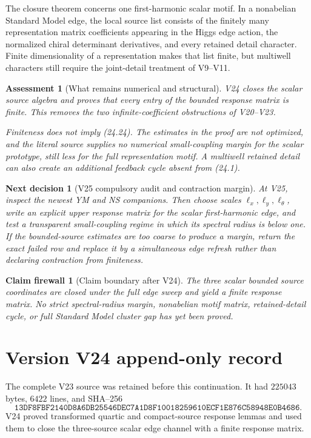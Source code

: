 \documentclass[11pt]{article}
\newtheorem{firewall}[theorem]{Claim firewall}
\newtheorem{decision}[theorem]{Next decision}
\newtheorem{assessment}[theorem]{Assessment}
\theoremstyle{remark}
\begin{document}
The closure theorem concerns one first-harmonic scalar motif.  In a
nonabelian Standard Model edge, the local source list consists of
the finitely many representation matrix coefficients appearing in
the Higgs edge action, the normalized chiral determinant
derivatives, and every retained detail character.  Finite
dimensionality of a representation makes that list finite, but
multiwell characters still require the joint-detail treatment of
V9--V11.

\begin{assessment}[What remains numerical and structural]
\label{ass:v15v24-reading}
V24 closes the scalar source algebra and proves that every entry of
the bounded response matrix is finite.  This removes the two
infinite-coefficient obstructions of V20--V23.

Finiteness does not imply (24.24).  The estimates in the proof are
not optimized, and the literal source supplies no numerical
small-coupling margin for the scalar prototype, still less for the
full representation motif.  A multiwell retained detail can also
create an additional feedback cycle absent from (24.1).
\end{assessment}

\begin{decision}[V25 compulsory audit and contraction margin]
\label{dec:v15v24-next}
At V25, inspect the newest YM and NS companions.  Then choose scales
\(\ell_x,\ell_y,\ell_\theta\), write an explicit upper response
matrix for the scalar first-harmonic edge, and test a transparent
small-coupling regime in which its spectral radius is below one.
If the bounded-source estimates are too coarse to produce a margin,
return the exact failed row and replace it by a simultaneous edge
refresh rather than declaring contraction from finiteness.
\end{decision}

\begin{firewall}[Claim boundary after V24]
\label{fire:v15v24}
The three scalar bounded source coordinates are closed under the
full edge sweep and yield a finite response matrix.  No strict
spectral-radius margin, nonabelian motif matrix, retained-detail
cycle, or full Standard Model cluster gap has yet been proved.
\end{firewall}

\section*{Version V24 append-only record}
The complete V23 source was retained before this continuation.  It
had \(225043\) bytes, \(6422\) lines, and SHA--256
\[
 \texttt{13DF8FBF2140D8A6DB25546DEC7A1D8F10018259610ECF1E876C58948E0B4686}.
\]
V24 proved transformed quartic and compact-source response lemmas
and used them to close the three-source scalar edge channel with a
finite response matrix.
\end{document}
